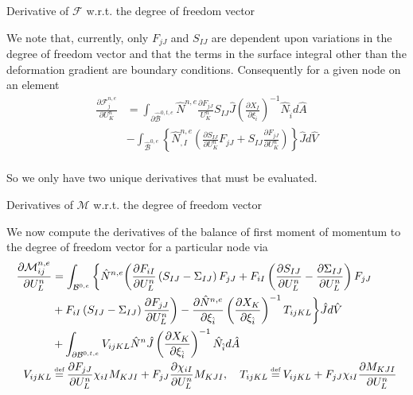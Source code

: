 \documentclass[11pt]{beamer}
\newcommand\defeq{\mathrel{\stackrel{\makebox[0pt]{\mbox{\normalfont\tiny def}}}{=}}}
\begin{document}
\begin{frame}{Derivative of $\mathcal{F}$ w.r.t. the degree of freedom vector}

We note that, currently, only $F_{jJ}$ and $S_{IJ}$ are dependent upon variations in the degree of freedom vector and that the terms in the surface integral other than the deformation gradient are boundary conditions. Consequently for a given node on an element
\begin{align*}
\frac{\partial \mathcal{F}_{j}^{n,e}}{\partial U_K^n} &= \int_{\partial \hat{\mathcal{B}}^{0,t,e}} \hat{N}^{n,e} \frac{\partial F_{jJ}}{U_K^n} S_{IJ} \hat{J} \left(\frac{\partial X_{I}}{\partial \xi_{\hat{i}}}\right)^{-1} \hat{N}_{\hat{i}} d\hat{A}\\ &- \int_{\hat{\mathcal{B}}^{0,e}} \left\{ \hat{N}^{n,e}_{,I} \left(\frac{\partial S_{IJ}}{\partial U_K^n} F_{jJ} + S_{IJ} \frac{\partial F_{jJ}}{\partial U_K^n}\right)\right\} \hat{J} d\hat{V}\\
\end{align*}

So we only have two unique derivatives that must be evaluated.

\end{frame}

\begin{frame}{Derivatives of $\mathcal{M}$ w.r.t. the degree of freedom vector}

We now compute the derivatives of the balance of first moment of momentum to the degree of freedom vector for a particular node via
\begin{align*}
\frac{\partial \mathcal{M}_{ij}^{n,e}}{\partial U_{L}^n} &= \int_{\mathcal{B}^{0,e}} \bigg\{ \hat{N}^{n,e} \bigg(\frac{\partial F_{iI}}{\partial U_{L}^n} \left(S_{IJ}-\Sigma_{IJ}\right) F_{jJ} + F_{iI}\left(\frac{\partial S_{IJ}}{\partial U_L^n}-\frac{\partial \Sigma_{IJ}}{\partial U_L^n}\right) F_{jJ}\\
& +F_{iI} \left(S_{IJ}-\Sigma_{IJ}\right) \frac{\partial F_{jJ}}{\partial U_L^n}\bigg)  - \frac{\partial \hat{N}^{n,e}}{\partial \xi_{\hat{i}}} \left(\frac{\partial X_{K}}{\partial \xi_{\hat{i}}}\right)^{-1} T_{ijKL}\bigg\} \hat{J} d\hat{V}\\
& + \int_{\partial \mathcal{B}^{0,t,e}} V_{ijKL} \hat{N}^n \hat{J} \left(\frac{\partial X_{K}}{\partial \xi_{\hat{i}}}\right)^{-1} \hat{N}_{\hat{i}} d\hat{A}\\
V_{ijKL} &\defeq \frac{\partial F_{jJ}}{\partial U_{L}^n} \chi_{iI}  M_{KJI} + F_{jJ} \frac{\partial \chi_{iI}}{\partial U_{L}^n}  M_{KJI},\ \ \ T_{ijKL} \defeq V_{ijKL} + F_{jJ} \chi_{iI}  \frac{\partial M_{KJI}}{\partial U_{L}^n}\\
\end{align*}

\end{frame}
\end{document}
